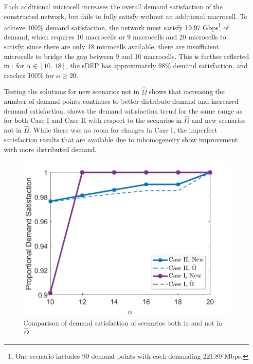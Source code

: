 \documentclass[12pt,dvipsnames]{report}
\begin{document}
Each additional microcell increases the overall demand satisfaction of the constructed network, but fails to fully satisfy without an additional macrocell.  To achieve 100\% demand satisfaction, the network must satisfy 19.97 Gbps\footnote{One scenario includes 90 demand points with each demanding 221.89 Mbps.} of demand, which requires 10 macrocells or 9 macrocells and 20 microcells to satisfy; since there are only 18 microcells available, there are insufficient microcells to bridge the gap between 9 and 10 macrocells.  This is further reflected in ; for $\alpha \in \left[ 10,\, 18 \right]$, the sDEP has approximately 98\% demand satisfaction, and reaches 100\% for $\alpha \geq 20$.

Testing the solutions for new scenarios not in $\hat{\Omega}$ shows that increasing the number of demand points continues to better distribute demand and increased demand satisfaction.   shows the demand satisfaction trend for the same range as  for both Case I and Case II with respect to the scenarios in $\hat{\Omega}$ and new scenarios not in $\hat{\Omega}$.  While there was no room for changes in Case I, the imperfect satisfaction results that are available due to inhomogeneity show improvement with more distributed demand.

\begin{figure}[htp]
	\centering
	\includegraphics[height=0.4\textheight]{Figures/CaseII_sDEPComparisonSatEvalCaseI}
	\caption[Comparison of Case I and Case II demand satisfaction of scenarios both in and not in $\hat{\Omega}$]{Comparison of demand satisfaction of scenarios both in and not in $\hat{\Omega}$}
	\label{fig:CaseII_sDEPComparisonSatEvalCaseI}
\end{figure}
\end{document}
